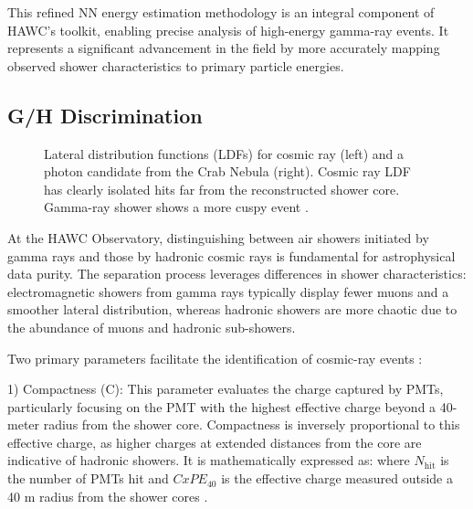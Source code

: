 This refined NN energy estimation methodology is an integral component of HAWC's toolkit, enabling precise analysis of high-energy gamma-ray events.
It represents a significant advancement in the field by more accurately mapping observed shower characteristics to primary particle energies.

\subsection{G/H Discrimination}\label{hawc:gammaHadron}

\begin{figure}
    \caption{Lateral distribution functions (LDFs) for cosmic ray (left) and a photon candidate from the Crab Nebula (right). Cosmic ray LDF has clearly isolated hits far from the reconstructed shower core. Gamma-ray shower shows a more cuspy event \cite{Abeysekara_2017}.}
    \label{fig:ldf_particleshower}
\end{figure}

At the HAWC Observatory, distinguishing between air showers initiated by gamma rays and those by hadronic cosmic rays is fundamental for astrophysical data purity.
The separation process leverages differences in shower characteristics: electromagnetic showers from gamma rays typically display fewer muons and a smoother lateral distribution, whereas hadronic showers are more chaotic due to the abundance of muons and hadronic sub-showers.

Two primary parameters facilitate the identification of cosmic-ray events \cite{Abeysekara_2017}:

1) Compactness (C): This parameter evaluates the charge captured by PMTs, particularly focusing on the PMT with the highest effective charge beyond a 40-meter radius from the shower core.
Compactness is inversely proportional to this effective charge, as higher charges at extended distances from the core are indicative of hadronic showers.
It is mathematically expressed as:
\compactness
where $N_\mathrm{hit}$ is the number of PMTs hit and $CxPE_{40}$ is the effective charge measured outside a 40 m radius from the shower cores \cite{Abeysekara_2017}.

